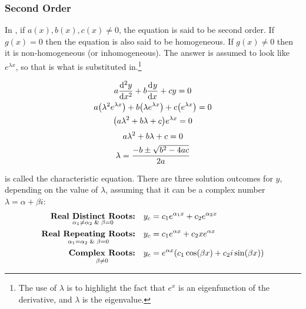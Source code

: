     \subsubsection{Second Order}
        In , if $a(x),b(x),c(x)\neq0$, the equation is said to be second order. If $g(x)=0$ then the equation is also said to be homogeneous. If $g(x)\neq0$ then it is non-homogeneous (or inhomogeneous). The answer is assumed to look like $e^{\lambda x}$, so that is what is substituted in.\footnote{The use of $\lambda$ is to highlight the fact that $e^x$ is an eigenfunction of the derivative, and $\lambda$ is the eigenvalue.}
        \begin{multicols}{2}\raggedcolumns
            {\length[0.25cm]
                \begin{gather*}
                    a\der[2]{y}{x}+b\der{y}{x}+cy=0
                    \\
                    a\qty(\lambda^2e^{\lambda x})+b\qty(\lambda e^{\lambda x})+c\qty(e^{\lambda x})=0
                    \\
                    \qty(a\lambda^2+b\lambda+c)e^{\lambda x}=0
                \end{gather*}
            }   
            {\length[0.25cm]
                \begin{gather}
                    a\lambda^2+b\lambda+c=0 \label{eqn:chareqn}
                    \\
                    \lambda=\frac{-b\pm\sqrt{b^2-4ac}}{2a}\notag
                \end{gather}
            } 
        \end{multicols}
         is called the characteristic equation.
        There are three solution outcomes for $y$, depending on the value of $\lambda$, assuming that it can be a complex number $\lambda=\alpha+\beta i$:
        {\length[0.7cm]
            \begin{align}
                \underset { \alpha_1 \neq \alpha_2\And \beta=0 }{\textbf{Real Distinct Roots:}}&& y_c&=c_1e^{\alpha_1x}+c_2e^{\alpha_2x}\label{eqn:realdistinctroots}
                \\
                \underset{\alpha_1=\alpha_2 \And \beta=0 }{\textbf{Real Repeating Roots:}}&& y_c&=c_1e^{\alpha x}+c_2xe^{\alpha x}\label{eqn:realrepeatroots}
                \\
                \underset{\beta \neq 0}{\textbf{Complex Roots:}}&& y_c&=e^{\alpha x}\qty(c_1\cos(\beta x)+c_2i\sin(\beta x))\label{eqn:complexroots}
            \end{align}
        }
